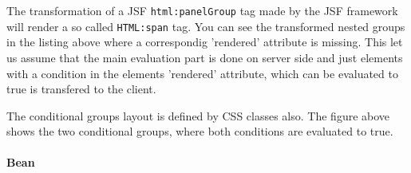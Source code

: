 The transformation of a JSF \texttt{html:panelGroup} tag made by the JSF
framework will render a so called \texttt{HTML:span} tag. You can see the
transformed nested groups in the listing above where a correspondig 'rendered'
attribute is missing. This let us assume that the main evaluation part is done
on server side and just elements with a condition in the elements 'rendered'
attribute, which can be evaluated to true is transfered to the client.

\begin{center}
\end{center}

The conditional groups layout is defined by CSS classes also. The figure above
shows the two conditional groups, where both conditions are evaluated to true.

\paragraph{Bean}
\label{para:referenceBean}